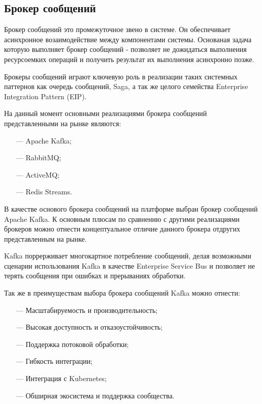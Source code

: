 \subsection{Брокер сообщений}

Брокер сообщений это промежуточное звено в системе. Он обеспечивает асинхронное возаимодействие между компонентами системы. Основаная задача которую выполняет брокер сообщений - позволяет не дожидаться выполнения ресурсоемких операций и получить результат их выполнения асинхронно позже. 

Брокеры сообщений играют ключевую роль в реализации таких системных паттернов как очередь сообщений\cite{raje2019performance}, Saga\cite{durr2021evaluation}, а так же целого семейства Enterprise Integration Pattern (EIP)\cite{hohpe2004enterprise}.

На данный момент основными реализациями брокера сообщений представленными на рынке являются:

\begin{itemize}
  \item[---] Apache Kafka;
  \item[---] RabbitMQ;
  \item[---] ActiveMQ;
  \item[---] Redis Streams.
\end{itemize}

В качестве основого брокера сообщений на платформе выбран брокер сообщений Apache Kafka.
К основным плюсам по сравнению с другими реализациями брокеров можно отнести концептуальное отличие данного брокера отдругих представленным на рынке.

Kafka поррерживает многокартное потребление сообщений, делая возможными сценарии использования Kafka в качестве Enterprise Service Bus\cite{menge2007enterprise} и позволяет не терять сообщения при ошибках и прерываниях обработки.

Так же в преимуществам выбора брокера сообщений Kafka можно отнести:

\begin{itemize}
  \item[---] Масштабируемость и производительность;
  \item[---] Высокая доступность и отказоустойчивость;
  \item[---] Поддержка потоковой обработки;
  \item[---] Гибкость интеграции;
  \item[---] Интеграция с Kubernetes;
  \item[---] Обширная экосистема и поддержка сообщества.
\end{itemize}

